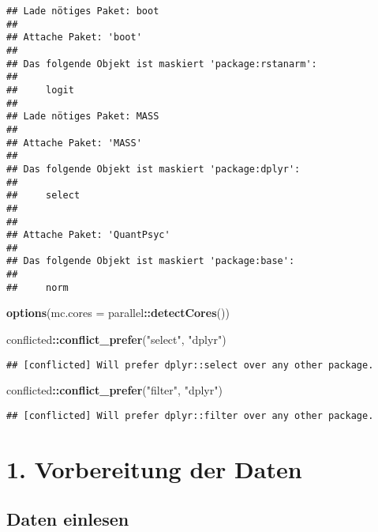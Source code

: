 \documentclass[
]{article}
\newenvironment{Shaded}{\begin{snugshade}}{\end{snugshade}}
\newcommand{\AttributeTok}[1]{\textcolor[rgb]{0.13,0.29,0.53}{#1}}
\newcommand{\FunctionTok}[1]{\textcolor[rgb]{0.13,0.29,0.53}{\textbf{#1}}}
\newcommand{\NormalTok}[1]{#1}
\newcommand{\SpecialCharTok}[1]{\textcolor[rgb]{0.81,0.36,0.00}{\textbf{#1}}}
\newcommand{\StringTok}[1]{\textcolor[rgb]{0.31,0.60,0.02}{#1}}
\begin{document}
\begin{verbatim}
## Lade nötiges Paket: boot
## 
## Attache Paket: 'boot'
## 
## Das folgende Objekt ist maskiert 'package:rstanarm':
## 
##     logit
## 
## Lade nötiges Paket: MASS
## 
## Attache Paket: 'MASS'
## 
## Das folgende Objekt ist maskiert 'package:dplyr':
## 
##     select
## 
## 
## Attache Paket: 'QuantPsyc'
## 
## Das folgende Objekt ist maskiert 'package:base':
## 
##     norm
\end{verbatim}

\begin{Shaded}
\begin{Highlighting}[]
\FunctionTok{options}\NormalTok{(}\AttributeTok{mc.cores =}\NormalTok{ parallel}\SpecialCharTok{::}\FunctionTok{detectCores}\NormalTok{())}
\end{Highlighting}
\end{Shaded}

\begin{Shaded}
\begin{Highlighting}[]
\NormalTok{conflicted}\SpecialCharTok{::}\FunctionTok{conflict\_prefer}\NormalTok{(}\StringTok{"select"}\NormalTok{, }\StringTok{"dplyr"}\NormalTok{)}
\end{Highlighting}
\end{Shaded}

\begin{verbatim}
## [conflicted] Will prefer dplyr::select over any other package.
\end{verbatim}

\begin{Shaded}
\begin{Highlighting}[]
\NormalTok{conflicted}\SpecialCharTok{::}\FunctionTok{conflict\_prefer}\NormalTok{(}\StringTok{"filter"}\NormalTok{, }\StringTok{"dplyr"}\NormalTok{)}
\end{Highlighting}
\end{Shaded}

\begin{verbatim}
## [conflicted] Will prefer dplyr::filter over any other package.
\end{verbatim}

\section{1. Vorbereitung der Daten}\label{vorbereitung-der-daten}

\subsection{Daten einlesen}\label{daten-einlesen}
\end{document}
